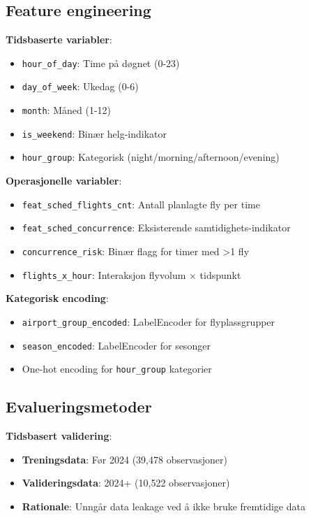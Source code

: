 \documentclass[11pt,a4paper]{article}
\begin{document}
\subsection{Feature engineering}

\textbf{Tidsbaserte variabler}:
\begin{itemize}
    \item \texttt{hour\_of\_day}: Time på døgnet (0-23)
    \item \texttt{day\_of\_week}: Ukedag (0-6)
    \item \texttt{month}: Måned (1-12)
    \item \texttt{is\_weekend}: Binær helg-indikator
    \item \texttt{hour\_group}: Kategorisk (night/morning/afternoon/evening)
\end{itemize}

\textbf{Operasjonelle variabler}:
\begin{itemize}
    \item \texttt{feat\_sched\_flights\_cnt}: Antall planlagte fly per time
    \item \texttt{feat\_sched\_concurrence}: Eksisterende samtidighets-indikator
    \item \texttt{concurrence\_risk}: Binær flagg for timer med >1 fly
    \item \texttt{flights\_x\_hour}: Interaksjon flyvolum × tidspunkt
\end{itemize}

\textbf{Kategorisk encoding}:
\begin{itemize}
    \item \texttt{airport\_group\_encoded}: LabelEncoder for flyplassgrupper
    \item \texttt{season\_encoded}: LabelEncoder for sesonger
    \item One-hot encoding for \texttt{hour\_group} kategorier
\end{itemize}

\subsection{Evalueringsmetoder}

\textbf{Tidsbasert validering}:
\begin{itemize}
    \item \textbf{Treningsdata}: Før 2024 (39,478 observasjoner)
    \item \textbf{Valideringsdata}: 2024+ (10,522 observasjoner)
    \item \textbf{Rationale}: Unngår data leakage ved å ikke bruke fremtidige data
\end{itemize}
\end{document}
